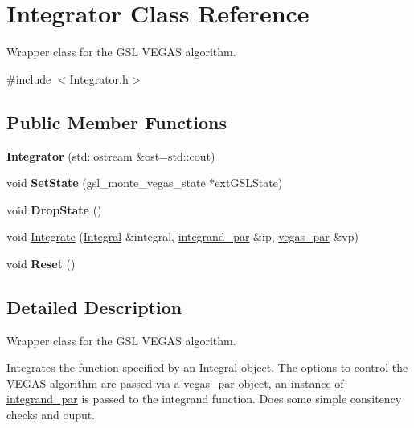 \hypertarget{classIntegrator}{}\section{Integrator Class Reference}
\label{classIntegrator}


Wrapper class for the G\+S\+L V\+E\+G\+A\+S algorithm.  




{\ttfamily \#include $<$Integrator.\+h$>$}

\subsection*{Public Member Functions}
\begin{DoxyCompactItemize}
\item 
\hypertarget{classIntegrator_a410d73f69871a01a49401a6705325a46}{}{\bfseries Integrator} (std\+::ostream \&ost=std\+::cout)\label{classIntegrator_a410d73f69871a01a49401a6705325a46}

\item 
\hypertarget{classIntegrator_aa4e70784278ed8a0e07bb59a153a4098}{}void {\bfseries Set\+State} (gsl\+\_\+monte\+\_\+vegas\+\_\+state $\ast$ext\+G\+S\+L\+State)\label{classIntegrator_aa4e70784278ed8a0e07bb59a153a4098}

\item 
\hypertarget{classIntegrator_a7abd0680a883e614c1e6344c8fda5360}{}void {\bfseries Drop\+State} ()\label{classIntegrator_a7abd0680a883e614c1e6344c8fda5360}

\item 
void \hyperlink{classIntegrator_a999142aeac7e98ab084eaad2c257a233}{Integrate} (\hyperlink{classIntegral}{Integral} \&integral, \hyperlink{classintegrand__par}{integrand\+\_\+par} \&ip, \hyperlink{classvegas__par}{vegas\+\_\+par} \&vp)
\item 
\hypertarget{classIntegrator_ac9ea33447f83278d1bd1dd37ac70e30e}{}void {\bfseries Reset} ()\label{classIntegrator_ac9ea33447f83278d1bd1dd37ac70e30e}

\end{DoxyCompactItemize}


\subsection{Detailed Description}
Wrapper class for the G\+S\+L V\+E\+G\+A\+S algorithm. 

Integrates the function specified by an \hyperlink{classIntegral}{Integral} object. The options to control the V\+E\+G\+A\+S algorithm are passed via a \hyperlink{classvegas__par}{vegas\+\_\+par} object, an instance of \hyperlink{classintegrand__par}{integrand\+\_\+par} is passed to the integrand function. Does some simple consitency checks and ouput. 

